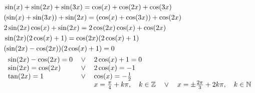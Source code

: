 \documentclass[preview,convert={density=300,outext=.png}]{standalone}
\begin{document}
\begin{align}
    & \sin(x) + \sin(2x) + \sin(3x) = \cos(x) + \cos(2x) + \cos(3x) \\
    & (\sin(x) + \sin(3x)) + \sin(2x) = (\cos(x) + \cos(3x)) + \cos(2x) \\
    & 2\sin(2x)\cos(x) + \sin(2x) = 2\cos(2x)\cos(x) + \cos(2x) \\
    & \sin(2x)(2\cos(x) + 1) = \cos(2x)(2\cos(x) + 1) \\
    & (\sin(2x) - \cos(2x))(2\cos(x) + 1) = 0 \\
    & \begin{tabular}{ l l l }
        $\sin(2x) - \cos(2x) = 0$ & $\vee$ & $2\cos(x) + 1 = 0$ \\
        $\sin(2x) = \cos(2x)$ & $\vee$ & $2\cos(x) = -1$ \\
        $\tan(2x) = 1$ & $\vee$ & $\cos(x) = -\frac{1}{2}$ \\
        & & $x = \frac{\pi}{4} + k\pi, \quad k \in \mathbb{Z} \quad \vee \quad x = \pm \frac{2\pi}{3} + 2k\pi, \quad k \in \mathbb{N}$ \\
    \end{tabular}
\end{align}
\end{document}
